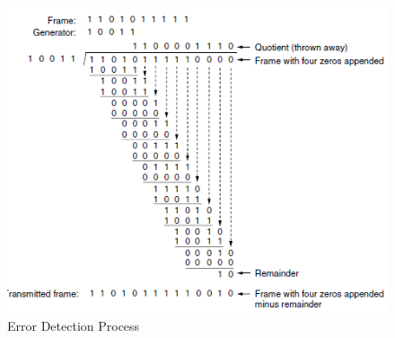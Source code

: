 \begin{figure}[!htbp]
	\centering
	\includegraphics [scale=0.55]{images/Intro/Imagen2.png}
	\caption{Error Detection Process}
\end{figure}